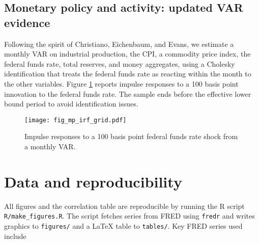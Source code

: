 \documentclass[11pt]{article}
\begin{document}
\subsection{Monetary policy and activity: updated VAR evidence}

Following the spirit of Christiano, Eichenbaum, and Evans, we estimate a monthly VAR on industrial production, the CPI, a commodity price index, the federal funds rate, total reserves, and money aggregates, using a Cholesky identification that treats the federal funds rate as reacting within the month to the other variables. Figure \ref{fig:mp-irf} reports impulse responses to a 100 basis point innovation to the federal funds rate. The sample ends before the effective lower bound period to avoid identification issues.

\begin{figure}[h]
\centering
\texttt{[image: fig\_mp\_irf\_grid.pdf]}
\caption{Impulse responses to a 100 basis point federal funds rate shock from a monthly VAR.}
\label{fig:mp-irf}
\end{figure}

\section{Data and reproducibility} \label{sec:data}

All figures and the correlation table are reproducible by running the R script \texttt{R/make\_figures.R}. The script fetches series from FRED using \texttt{fredr} and writes graphics to \texttt{figures/} and a LaTeX table to \texttt{tables/}. Key FRED series used include
\end{document}
